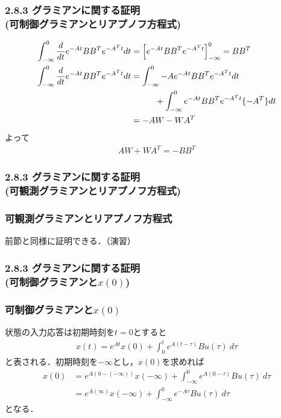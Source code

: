 \begin{frame}[t]
\frametitle{2.8.3 グラミアンに関する証明\\ (可制御グラミアンとリアプノフ方程式)}
\begin{align}
	\int_{-\infty}^{0} \frac{d}{dt}e^{-At} B B^T e^{-A^T t} d t
	&= \left[ e^{-At} B B^T e^{-A^T t} \right]_{-\infty}^0 = B B^T
\\
	\int_{-\infty}^{0} \frac{d}{dt}e^{-At} B B^T e^{-A^T t} d t
	&= \int_{-\infty}^{0}  -A e^{-At} B B^T e^{-A^T t} d t
\nonumber \\
	& \hspace*{1cm}
	   +\int_{-\infty}^{0} e^{-At} B B^T e^{-A^T t} \{-A^T\} d t
\nonumber \\
	&= -A W  - W A^T
\end{align}
よって
\begin{align}
	AW + W A^T = - B B^T
\end{align}

\end{frame}

\begin{frame}[t]
\frametitle{2.8.3 グラミアンに関する証明\\ (可観測グラミアンとリアプノフ方程式)}
\subsubsection{可観測グラミアンとリアプノフ方程式}

前節と同様に証明できる．（演習）

\end{frame}

\begin{frame}[t]
\frametitle{2.8.3 グラミアンに関する証明\\ (可制御グラミアンと$x(0)$)}
\subsubsection{可制御グラミアンと$x(0)$}

状態の入力応答は初期時刻を$t=0$とすると
\begin{align}
	x(t)= e^{At}x(0) + \int_{0}^{t} e^{A(t-\tau)}Bu(\tau) \ d \tau
\end{align}
と表される．初期時刻を$-\infty$とし，$x(0)$を求めれば
\begin{align}
	x(0) &= e^{A(0-(-\infty))}x(-\infty) + \int_{-\infty}^{0} e^{A(0-\tau)}Bu(\tau) \ d \tau
\nonumber \\
	&= e^{A(\infty)}x(-\infty) + \int_{-\infty}^{0} e^{-A\tau}Bu(\tau) \ d \tau
\end{align}
となる．
\end{frame}

